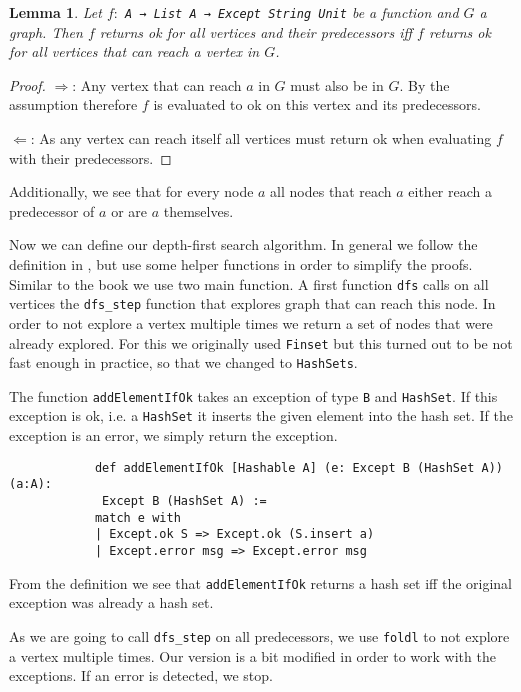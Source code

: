\documentclass{article}
\newtheorem{lemma}{Lemma}
\begin{document}
        \begin{lemma}
            Let $f:$ \texttt{A → List A → Except String Unit} be a function and $G$ a graph. Then $f$ returns ok for all vertices and their predecessors iff $f$ returns ok for all vertices that can reach a vertex in $G$. 
        \end{lemma}
        \begin{proof}
            $\Rightarrow$: Any vertex that can reach $a$ in $G$ must also be in $G$. By the assumption therefore $f$ is evaluated to ok on this vertex and its predecessors.

            $\Leftarrow$: As any vertex can reach itself all vertices must return ok when evaluating $f$ with their predecessors.
        \end{proof}

        Additionally, we see that for every node $a$ all nodes that reach $a$ either reach a predecessor of $a$ or are $a$ themselves.

        Now we can define our depth-first search algorithm. In general we follow the definition in \cite{AlgorithmsBook}, but use some helper functions in order to simplify the proofs. Similar to the book we use two main function. A first function \texttt{dfs} calls on all vertices the \texttt{dfs\_step} function that explores graph that can reach this node. In order to not explore a vertex multiple times we return a set of nodes that were already explored. For this we originally used \texttt{Finset} but this turned out to be not fast enough in practice, so that we changed to \texttt{HashSets}.

        The function \texttt{addElementIfOk} takes an exception of type \texttt{B} and \texttt{HashSet}. If this exception is ok, i.e. a \texttt{HashSet} it inserts the given element into the hash set. If the exception is an error, we simply return the exception.

        \begin{lstlisting}
            def addElementIfOk [Hashable A] (e: Except B (HashSet A)) (a:A):
             Except B (HashSet A) :=
            match e with
            | Except.ok S => Except.ok (S.insert a)
            | Except.error msg => Except.error msg
        \end{lstlisting}

        From the definition we see that \texttt{addElementIfOk} returns a hash set iff the original exception was already a hash set.

        As we are going to call \texttt{dfs\_step} on all predecessors, we use \texttt{foldl} to not explore a vertex multiple times. Our version is a bit modified in order to work with the exceptions. If an error is detected, we stop.
\end{document}
